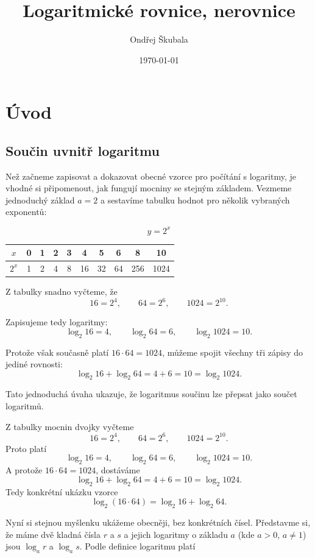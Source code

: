 \documentclass[12pt,a4paper]{article}
\title{Logaritmické rovnice, nerovnice}
\author{Ondřej Škubala}
\date{\today}
\begin{document}
\maketitle
\newpage

\section{Úvod}

\subsection*{Součin uvnitř logaritmu}

Než začneme zapisovat a dokazovat obecné vzorce pro počítání s logaritmy, je vhodné
si připomenout, jak fungují mocniny se stejným základem. Vezmeme jednoduchý základ
$a=2$ a sestavíme tabulku hodnot pro několik vybraných exponentů:

\[
y = 2^x
\]

\begin{center}
\begin{tabular}{c|ccccccccc}
$x$     & 0 & 1 & 2 & 3 & 4  & 5  & 6  & 8   & 10   \\
\hline
$2^x$   & 1 & 2 & 4 & 8 & 16 & 32 & 64 & 256 & 1024 \\
\end{tabular}
\end{center}

Z tabulky snadno vyčteme, že
\[
16 = 2^4,\qquad 64 = 2^6,\qquad 1024 = 2^{10}.
\]

Zapisujeme tedy logaritmy:
\[
\log_2 16 = 4,\qquad \log_2 64 = 6,\qquad \log_2 1024 = 10.
\]

Protože však současně platí $16 \cdot 64 = 1024$, můžeme spojit všechny tři zápisy do jediné
rovnosti:
\[
\log_2 16 + \log_2 64 = 4 + 6 = 10 = \log_2 1024.
\]

Tato jednoduchá úvaha ukazuje, že logaritmus součinu lze přepsat jako součet logaritmů.

\begin{examplebox}
Z tabulky mocnin dvojky vyčteme
\[
16 = 2^4,\qquad 64 = 2^6,\qquad 1024 = 2^{10}.
\]
Proto platí
\[
\log_2 16 = 4,\qquad
\log_2 64 = 6,\qquad
\log_2 1024 = 10.
\]
A protože $16 \cdot 64 = 1024$, dostáváme
\[
\log_2 16 + \log_2 64 = 4 + 6 = 10 = \log_2 1024.
\]
Tedy konkrétní ukázku vzorce
\[
\log_2(16 \cdot 64) = \log_2 16 + \log_2 64.
\]
\end{examplebox}


Nyní si stejnou myšlenku ukážeme obecněji, bez konkrétních čísel. Představme si,
že máme dvě kladná čísla $r$ a $s$ a jejich logaritmy o základu $a$ (kde $a>0$, $a \neq 1$)
jsou $\log_a r$ a $\log_a s$. Podle definice logaritmu platí
\end{document}
